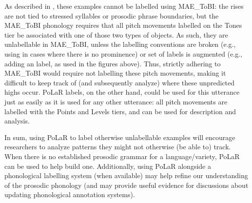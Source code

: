 \documentclass[11pt, twoside]{memoir}
\def\textlabel#1{{\relsize{-.5}\fontspec[Mapping=tex-text]{Roboto Mono}{#1}}}
\begin{document}
As described in \citealt{ahnzhou19}, these examples cannot be labelled using MAE\_ToBI: the rises are not tied to stressed syllables or prosodic phrase boundaries, but the MAE\_ToBI phonology requires that all pitch movements labelled on the Tones tier be associated with one of those two types of objects. As such, they are unlabellable in MAE\_ToBI, unless the labelling conventions are broken (e.g., using \textlabel{H*} in cases where there is no prominence) or set of labels is augmented (e.g., adding an \textlabel{h} label, as used in the figures above). Thus, strictly adhering to MAE\_ToBI would require not labelling these pitch movements, making it difficult to keep track of (and subsequently analyze) where these unpredicted highs occur. PoLaR labels, on the other hand, could be used for this utterance just as easily as it is used for any other utterance: all pitch movements are labelled with the Points and Levels tiers, and can be used for description and analysis.

In sum, using PoLaR to label otherwise unlabellable examples will encourage researchers to analyze patterns they might not otherwise (be able to) track. When there is no established prosodic grammar for a language\slash variety, PoLaR can be used to help build one. Additionally, using PoLaR alongside a phonological labelling system (when available) may help refine our understanding of the prosodic phonology (and may provide useful evidence for discussions about updating phonological annotation systems).
\end{document}
